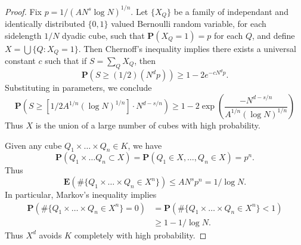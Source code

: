\begin{proof}
    Fix $p = 1/(AN^s \log N)^{1/n}$. Let $\{ X_Q \}$ be a family of independant and identically distributed $\{ 0, 1 \}$ valued Bernoulli random variable, for each sidelength $1/N$ dyadic cube, such that $\mathbf{P}(X_Q = 1) = p$ for each $Q$, and define $X = \bigcup \{ Q : X_Q = 1 \}$. Then Chernoff's inequality implies there exists a universal constant $c$ such that if $S = \sum_Q X_Q$, then
    \[ \mathbf{P} \left( S \geq (1/2)(N^d p) \right) \geq 1 - 2 e^{- c N^d p}. \]
    Substituting in parameters, we conclude
    \begin{equation} \label{fourierdim1} \mathbf{P} \left( S \geq \left[ 1/2 A^{1/n} (\log N)^{1/n} \right] \cdot N^{d - s/n} \right) \geq 1 - 2 \exp \left( \frac{-N^{d-s/n}}{A^{1/n} (\log N)^{1/n}} \right) \end{equation}
    Thus $X$ is the union of a large number of cubes with high probability.

    Given any cube $Q_1 \times \dots \times Q_n \in K$, we have
    \[ \mathbf{P}(Q_1 \times \dots Q_n \subset X) = \mathbf{P}(Q_1 \in X, \dots, Q_n \in X) = p^n. \]
    Thus
    \[ \mathbf{E}(\# \{ Q_1 \times \dots \times Q_n \in X^n \}) \leq A N^s p^n = 1/\log N. \]
    In particular, Markov's inequality implies
    \begin{equation} \label{fourierdim2}
    \begin{split}
        \mathbf{P}(\# \{ Q_1 \times \dots \times Q_n \in X^n \} = 0) &= \mathbf{P}(\# \{ Q_1 \times \dots \times Q_n \in X^n \} < 1)\\
        &\geq 1 - 1/\log N.
    \end{split}
    \end{equation}
    Thus $X^d$ avoids $K$ completely with high probability.


\end{proof}
